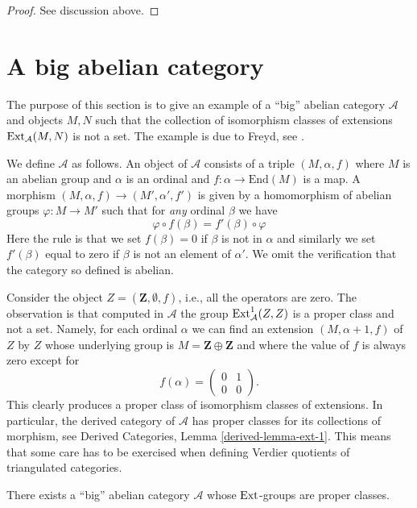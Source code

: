 \begin{proof}
See discussion above.
\end{proof}



\section{A big abelian category}
\label{section-big}

\noindent
The purpose of this section is to give an example of a ``big'' abelian category
$\mathcal{A}$ and objects $M, N$ such that the collection of isomorphism
classes of extensions $\mathop{\mathrm{Ext}}\nolimits_\mathcal{A}(M, N)$ is not a set.
The example is due to Freyd, see \cite[page 131, Exercise A]{Freyd}.

\medskip\noindent
We define $\mathcal{A}$ as follows. An object of $\mathcal{A}$
consists of a triple $(M, \alpha, f)$ where $M$ is an abelian group and
$\alpha$ is an ordinal and $f : \alpha \to \text{End}(M)$ is a map.
A morphism $(M, \alpha, f) \to (M', \alpha', f')$ is given by a homomorphism
of abelian groups $\varphi : M \to M'$ such that for {\it any} ordinal $\beta$
we have
$$
\varphi \circ f(\beta) = f'(\beta) \circ \varphi
$$
Here the rule is that we set $f(\beta) = 0$ if $\beta$ is not in
$\alpha$ and similarly we set $f'(\beta)$ equal to zero if $\beta$ is not an
element of $\alpha'$. We omit the verification that the category so defined
is abelian.

\medskip\noindent
Consider the object $Z = (\mathbf{Z}, \emptyset, f)$, i.e., all the
operators are zero. The observation is that computed in
$\mathcal{A}$ the group $\mathop{\mathrm{Ext}}\nolimits^1_\mathcal{A}(Z, Z)$ is a proper class
and not a set. Namely, for each ordinal $\alpha$ we can find an extension
$(M, \alpha + 1, f)$ of $Z$ by $Z$ whose underlying group is
$M = \mathbf{Z} \oplus \mathbf{Z}$ and where the value of $f$ is
always zero except for
$$
f(\alpha) =
\left(
\begin{matrix}
0 & 1 \\
0 & 0
\end{matrix}
\right).
$$
This clearly produces a proper class of isomorphism classes of extensions.
In particular, the derived category of $\mathcal{A}$ has proper classes for
its collections of morphism, see
Derived Categories, Lemma \ref{derived-lemma-ext-1}. This means that some
care has to be exercised when defining Verdier quotients of triangulated
categories.

\begin{lemma}
\label{lemma-big-abelian-category}
There exists a ``big'' abelian category $\mathcal{A}$ whose
$\mathop{\mathrm{Ext}}\nolimits$-groups are proper classes.
\end{lemma}

